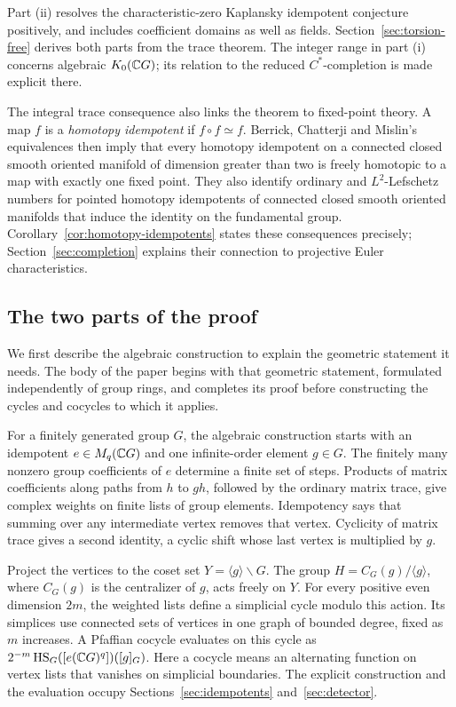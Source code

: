 Part \textup{(ii)} resolves the characteristic-zero Kaplansky idempotent
conjecture positively, and includes coefficient domains as well as fields.
Section~\ref{sec:torsion-free} derives both parts from the trace theorem.
The integer range in part \textup{(i)} concerns algebraic $K_0(\mathbb C G)$;
its relation to the reduced $C^*$-completion is made explicit there.

The integral trace consequence also links the theorem to fixed-point
theory. A map $f$ is a \emph{homotopy idempotent} if $f\circ f\simeq f$.
Berrick, Chatterji and Mislin's equivalences \cite[Theorems 1--2]{BCM2006}
then imply that every homotopy idempotent on a connected closed smooth
oriented manifold of dimension greater than two is freely homotopic to
a map with exactly one fixed point. They also identify ordinary and
$L^2$-Lefschetz numbers for pointed homotopy idempotents of connected
closed smooth oriented manifolds that induce the identity on the
fundamental group.
Corollary~\ref{cor:homotopy-idempotents} states these consequences precisely;
Section~\ref{sec:completion} explains their connection to projective
Euler characteristics.

\subsection{The two parts of the proof}

We first describe the algebraic construction to explain the geometric
statement it needs. The body of the paper begins with that geometric
statement, formulated independently of group rings, and completes its
proof before constructing the cycles and cocycles to which it applies.

For a finitely generated group $G$, the algebraic construction starts
with an idempotent $e\in M_q(\mathbb C G)$ and one infinite-order element
$g\in G$. The finitely many nonzero group coefficients of $e$ determine
a finite set of steps. Products of matrix
coefficients along paths from $h$ to $gh$, followed by the ordinary
matrix trace, give complex weights on finite lists of group elements.
Idempotency says that summing over any intermediate vertex removes that
vertex. Cyclicity of matrix trace gives a second identity, a cyclic shift
whose last vertex is multiplied by $g$.

Project the vertices to the coset set $Y=\langle g\rangle\backslash G$.
The group $H=C_G(g)/\langle g\rangle$, where $C_G(g)$ is the centralizer
of $g$, acts freely on $Y$. For every positive even dimension $2m$, the weighted
lists define a simplicial cycle modulo this action. Its simplices use
connected sets of vertices in one graph of bounded degree, fixed as $m$
increases. A Pfaffian cocycle evaluates on this cycle as
$2^{-m}\operatorname{HS}_G([e(\mathbb C G)^q])([g]_G)$. Here a cocycle means an alternating
function on vertex lists that vanishes on simplicial boundaries. The
explicit construction and the evaluation occupy
Sections~\ref{sec:idempotents} and~\ref{sec:detector}.

